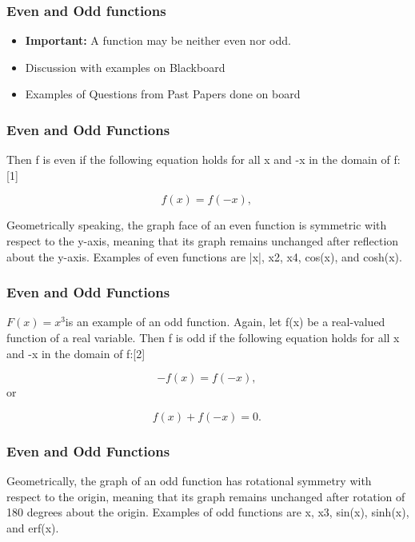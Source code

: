 \begin{frame}
	\frametitle{Even and Odd functions}
	\begin{itemize}
    \item \textbf{Important:} A function may be neither even nor odd.
	\item Discussion with examples on Blackboard
	\item Examples of Questions from Past Papers done on board
	\end{itemize}
	
\end{frame}
\begin{frame}
\frametitle{Even and Odd Functions}
\Large
Then f is even if the following equation holds for all x and -x in the domain of f:[1]

\[f(x) = f(-x), \,\]

Geometrically speaking, the graph face of an even function is symmetric with respect to the y-axis, meaning that its graph remains unchanged after reflection about the y-axis.
Examples of even functions are |x|, x2, x4, cos(x), and cosh(x).
\end{frame}
\begin{frame}
	\frametitle{Even and Odd Functions}
	\Large




$F(x) = x^3 $is an example of an odd function.
Again, let f(x) be a real-valued function of a real variable. Then f is odd if the following equation holds for all x and -x in the domain of f:[2]

\[-f(x) = f(-x), \,\]
or

\[f(x) + f(-x) = 0. \,\]
\end{frame}
\begin{frame}
	\frametitle{Even and Odd Functions}
	\Large
Geometrically, 
	the graph of an odd function has rotational symmetry with respect to the origin, meaning that its graph remains unchanged after rotation of 180 degrees about the origin.
Examples of odd functions are x, x3, sin(x), sinh(x), and erf(x).
\end{frame}

